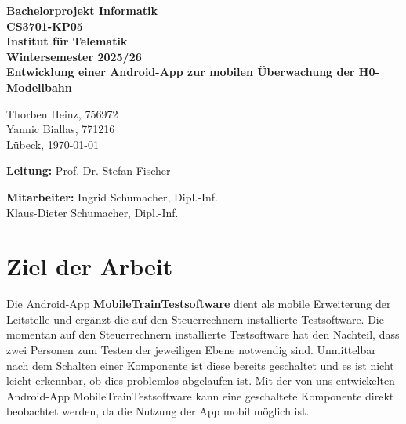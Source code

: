 \documentclass{article}
\begin{document}
\parindent0cm %

\thispagestyle{empty}


\begin{center}
\begin{Huge}
\textbf{Bachelorprojekt Informatik \\ \vspace{0.2cm}
CS3701-KP05\\ \vspace{2.5cm}
Institut für Telematik\\ \vspace{0.2cm}
Wintersemester 2025/26\\\vspace{2.5cm}
Entwicklung einer Android-App zur mobilen
Überwachung der H0-Modellbahn}\vspace{1.5cm}
\end{Huge}


\begin{huge}
Thorben Heinz, 756972 \\
Yannic Biallas, 771216 \\
Lübeck, \today

\textbf{Leitung:} Prof. Dr. Stefan Fischer

\textbf{Mitarbeiter:} Ingrid Schumacher, Dipl.-Inf.\\
Klaus-Dieter Schumacher, Dipl.-Inf.
\end{huge}

\end{center}


\setcounter{page}{0}

\newpage
{}


\tableofcontents

\newpage


\setcounter{page}{0}

\section{Ziel der Arbeit}
Die Android-App \textbf{\glqq{}MobileTrainTestsoftware\grqq{}} dient als mobile Erweiterung der Leitstelle und ergänzt die auf den Steuerrechnern installierte Testsoftware.
Die momentan auf den Steuerrechnern installierte Testsoftware hat den Nachteil, dass zwei Personen zum Testen der jeweiligen Ebene notwendig sind.
Unmittelbar nach dem Schalten einer Komponente ist diese bereits geschaltet und es ist nicht leicht erkennbar, ob dies problemlos abgelaufen ist.
Mit der von uns entwickelten Android-App \glqq{}MobileTrainTestsoftware\grqq{} kann eine geschaltete Komponente direkt beobachtet werden, da die Nutzung der App mobil möglich ist.
\end{document}
